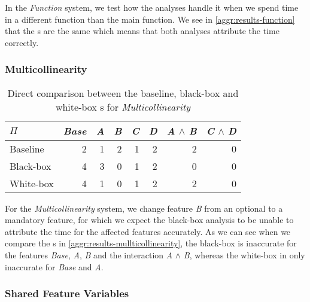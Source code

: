 In the \emph{Function} system, we test how the analyses handle it when we spend time in a different function than the main function. 
We see in \autoref{aggr:results-function} that the {\perfInfluenceModel}s are the same which means 
that both analyses attribute the time correctly.

\subsubsection*{Multicollinearity}

\begin{table}[H]
    \centering
    \begin{tabular}{lrrrrrrr}
    \toprule
    $\Pi$    & \emph{Base} & \emph{A} & \emph{B} & \emph{C} & \emph{D} & \emph{A} $\land$ \emph{B} & \emph{C} $\land$ \emph{D}  \\ \midrule
    Baseline & 2    & 1 & 2 & 1 & 2 & 2           & 0            \\
    Black-box & 4   & 3 & 0 & 1 & 2 & 0           & 0            \\
    White-box &   4 &  1 &  0 &  1 &  2 &     2 &     0 \\ \bottomrule
    \end{tabular}  
    \caption{Direct comparison between the baseline, black-box and white-box {\perfInfluenceModel}s for \emph{Multicollinearity}}
    \label{aggr:results-mullticollinearity}
\end{table}

For the \emph{Multicollinearity} system, we change feature \emph{B} from an optional to a mandatory feature, 
for which we expect the black-box analysis to be unable to attribute the time for the affected features accurately.
As we can see when we compare the {\perfInfluenceModel}s in \autoref{aggr:results-mullticollinearity}, 
the black-box is inaccurate for the features \emph{Base}, \emph{A}, \emph{B} and 
the interaction \emph{A} $\land$ \emph{B}, whereas the white-box in only inaccurate for \emph{Base} and \emph{A}.

\subsubsection*{Shared Feature Variables}


